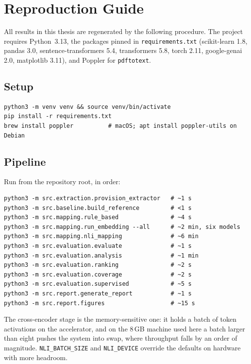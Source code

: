 \chapter{Reproduction Guide}\label{app:reproduction}

All results in this thesis are regenerated by the following procedure. The
project requires Python~3.13, the packages pinned in
\texttt{requirements.txt} (scikit-learn 1.8, pandas 3.0, sentence-transformers
5.4, transformers 5.8, torch 2.11, google-genai 2.0, matplotlib 3.11), and
Poppler for \texttt{pdftotext}.

\section*{Setup}

\begin{verbatim}
python3 -m venv venv && source venv/bin/activate
pip install -r requirements.txt
brew install poppler          # macOS; apt install poppler-utils on Debian
\end{verbatim}

\section*{Pipeline}

Run from the repository root, in order:

\begin{verbatim}
python3 -m src.extraction.provision_extractor   # ~1 s
python3 -m src.baseline.build_reference         # <1 s
python3 -m src.mapping.rule_based               # ~4 s
python3 -m src.mapping.run_embedding --all      # ~2 min, six models
python3 -m src.mapping.nli_mapping              # ~6 min
python3 -m src.evaluation.evaluate              # ~1 s
python3 -m src.evaluation.analysis              # ~1 min
python3 -m src.evaluation.ranking               # ~2 s
python3 -m src.evaluation.coverage              # ~2 s
python3 -m src.evaluation.supervised            # ~5 s
python3 -m src.report.generate_report           # ~1 s
python3 -m src.report.figures                   # ~15 s
\end{verbatim}

\noindent The cross-encoder stage is the memory-sensitive one: it holds a batch
of token activations on the accelerator, and on the 8\,GB machine used here a
batch larger than eight pushes the system into swap, where throughput falls by
an order of magnitude. \texttt{NLI\_BATCH\_SIZE} and \texttt{NLI\_DEVICE}
override the defaults on hardware with more headroom.

